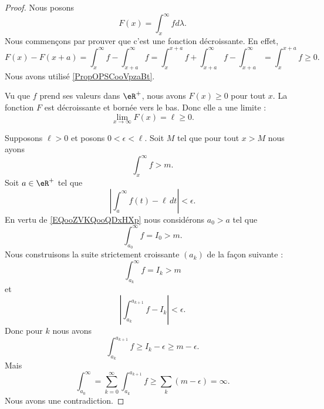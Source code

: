 \begin{proof}
	Nous posons
	\begin{equation}
		F(x)= \int_x^{\infty}fd\lambda.
	\end{equation}
	Nous commençons par prouver que c'est une fonction décroissante. En effet,
	\begin{equation}
		F(x)-F(x+a)=\int_{x}^{\infty}f-\int_{x+a}^{\infty}f=\int_{x}^{x+a}f+\int_{x+a}^{\infty}f-\int_{x+a}^{\infty}=\int_x^{x+a}f\geq 0.
	\end{equation}
	Nous avons utilisé \ref{PropOPSCooVpzaBt}.

	Vu que \( f\) prend ses valeurs dans \( \eR^+\), nous avons \( F(x)\geq 0\) pour tout \( x\). La fonction \( F\) est décroissante et bornée vers le bas. Donc elle a une limite :
	\begin{equation}
		\lim_{x\to \infty} F(x)=\ell\geq 0.
	\end{equation}

	Supposons \( \ell >0\) et posons \( 0<\epsilon<\ell\). Soit \( M\) tel que pour tout \( x>M\) nous ayons
	\begin{equation}        \label{EQooZVKQooQDxHXp}
		\int_x^{\infty}f>m.
	\end{equation}
	Soit \( a\in \eR^+\) tel que
	\begin{equation}
		| \int_a^{\infty}f(t)-\ell\,dt |<\epsilon.
	\end{equation}
	En vertu de \eqref{EQooZVKQooQDxHXp} nous considérons \( a_0>a\) tel que
	\begin{equation}
		\int_{a_0}^{\infty}f=I_0>m.
	\end{equation}
	Nous construisons la suite strictement croissante \( (a_k)\) de la façon suivante :
	\begin{equation}
		\int_{a_k}^{\infty}f=I_k>m
	\end{equation}
	et
	\begin{equation}
		| \int_{a_k}^{a_{k+1}}f-I_k |<\epsilon.
	\end{equation}
	Donc pour \( k\) nous avons
	\begin{equation}
		\int_{a_k}^{a_{k+1}}f\geq I_k-\epsilon\geq m-\epsilon.
	\end{equation}
	Mais
	\begin{equation}
		\int_{a_0}^{\infty}=\sum_{k=0}^{\infty}\int_{a_k}^{a_{k+1}}f\geq \sum_k(m-\epsilon)=\infty.
	\end{equation}
	Nous avons une contradiction.
\end{proof}

